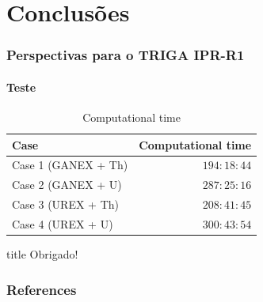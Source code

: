 \documentclass[svgnames,smaller,table]{beamer}
\begin{document}




\section{Conclusões}
\begin{frame}
  \frametitle{Perspectivas para o TRIGA IPR-R1}
  \framesubtitle{Teste}
  \begin{table}%
    \caption{Computational time}
    \label{time}
    \centering
    \vspace{0.5cm}
    \begin{tabular}{l|r}\hline   
      Case & Computational time\\ \hline
      Case 1 (GANEX + Th) & $194:18:44 $\\ \hline
      Case 2 (GANEX + U) & $287:25:16 $\\ \hline
      Case 3 (UREX + Th) & $208:41:45 $\\ \hline
      Case 4 (UREX + U) & $300:43:54 $\\ \hline
    \end{tabular}
  \end{table}
  
\end{frame}

\begin{frame}
 \vfill
  \begin{beamercolorbox}[center]{title}
     \Huge{Obrigado!}
  \end{beamercolorbox}
  \vfill
\end{frame}

\begin{frame}
    \frametitle{References}
    
    
\end{frame}
\end{document}
